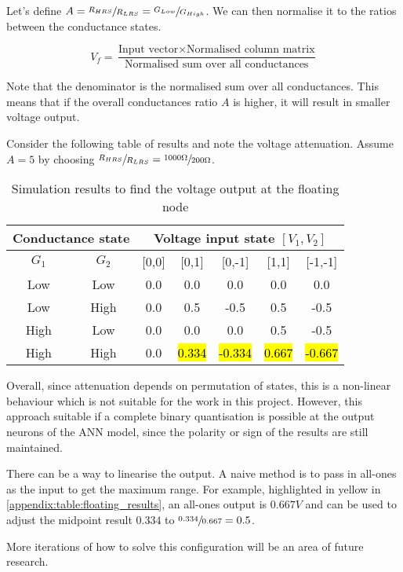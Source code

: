 \noindent
Let's define $A = \sfrac{R_{HRS}}{R_{LRS}} = \sfrac{G_{Low}}{G_{High}}$. We can then normalise it to the ratios between the conductance states.

$$
    V_f = \frac
    { \text{Input vector} \times \text{Normalised column matrix} }
    { \text{Normalised sum over all conductances} }
$$

\noindent
Note that the denominator is the normalised sum over all conductances. This means that if the overall conductances ratio $A$ is higher, it will result in smaller voltage output.

\vspace{1em}

\noindent
Consider the following table of results and note the voltage attenuation. Assume $A = 5$ by choosing $\sfrac{R_{HRS}}{R_{LRS}} = \sfrac{1000 \Omega}{200 \Omega}$.

\begin{table}[h]
    \centering
    \begin{tabular}{|c|c|c|c|c|c|c|}
        \hline
        \multicolumn{2}{|c|}{\textbf{Conductance state}} & \multicolumn{5}{|c|}{\textbf{Voltage input state $[V_1, V_2]$}} \\
        \hline
        $G_1$ & $G_2$ & [0,0] & [0,1] & [0,-1] & [1,1] & [-1,-1] \\ 
        \hline
        \hline
        Low & Low   & 0.0 & 0.0   & 0.0    & 0.0 & 0.0 \\
        \hline
        Low & High  & 0.0 & 0.5   & -0.5   & 0.5 & -0.5 \\
        \hline
        High & Low  & 0.0 & 0.0   & 0.0    & 0.5 & -0.5 \\
        \hline
        High & High & 0.0 & \hl{0.334} & \hl{-0.334} & \hl{0.667} & \hl{-0.667} \\
        \hline
    \end{tabular} 
    
    \caption{Simulation results to find the voltage output at the floating node}
    \label{appendix:table:floating_results}
\end{table}

\noindent
Overall, since attenuation depends on permutation of states, this is a non-linear behaviour which is not suitable for the work in this project. 
However, this approach suitable if a complete binary quantisation is possible at the output neurons of the \ac{ANN} model, since the polarity or sign of the results are still maintained.

\noindent
There can be a way to linearise the output. A naive method is to pass in all-ones as the input to get the maximum range. For example, highlighted in yellow in \autoref{appendix:table:floating_results}, an all-ones output is $0.667V$ and can be used to adjust the midpoint result $0.334$ to $\sfrac{0.334}{0.667} = 0.5$.

\noindent
More iterations of how to solve this configuration will be an area of future research.

